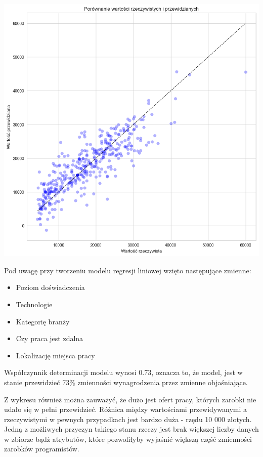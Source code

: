 \documentclass{article}
\begin{document}
\begin{center}
    \includegraphics[scale=0.5]{img/model_pred_1.png}
\end{center}

Pod uwagę przy tworzeniu modelu regresji liniowej wzięto następujące zmienne:
\begin{itemize}
    \item Poziom doświadczenia
    \item Technologie
    \item Kategorię branży
    \item Czy praca jest zdalna
    \item Lokalizację miejsca pracy
\end{itemize}

Współczynnik determinacji modelu wynosi 0.73, oznacza to, że model, jest w stanie przewidzieć 73\% zmienności wynagrodzenia przez zmienne objaśniające.

Z wykresu również można zauważyć, że dużo jest ofert pracy, których zarobki nie udało się w pełni przewidzieć.
Różnica między wartościami przewidywanymi a rzeczywistymi w pewnych przypadkach jest bardzo duża - rzędu 10 000 złotych.
Jedną z możliwych przyczyn takiego stanu rzeczy jest brak większej liczby danych w zbiorze bądź atrybutów,
które pozwoliłyby wyjaśnić większą część zmienności zarobków programistów.
\end{document}
